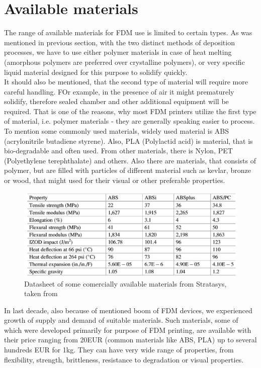 \documentclass[a4paper, twoside, 11pt]{report}
\begin{document}
\section{Available materials}
The range of available materials for FDM use is limited to certain types. As was mentioned in previous section, with the two distinct methods of deposition processes, we have to use either polymer materials in case of heat melting (amorphous polymers are preferred over crystalline polymers), or very specific liquid material designed for this purpose to solidify quickly.\\
	It should also be mentioned, that the second type of material will require more careful handling. FOr example, in the presence of air it might prematurely solidify, therefore sealed chamber and other additional equipment will be required. That is one of the reasons, why most FDM printers utilize the first type of material, i.e. polymer materials - they are generally speaking easier to process.\\
	To mention some commonly used materials, widely used material is ABS (acrylonitrile butadiene styrene). Also, PLA (Polylactid acid) is material, that is bio-degradable and often used. From other materials, there is Nylon, PET (Polyethylene terephthalate) and others. Also there are materials, that consists of polymer, but are filled with particles of different material such as kevlar, bronze or wood, that might used  for their visual or other preferable properties.
\begin{figure}[h]
	\centering
	\includegraphics[scale=0.7]{datasheetFDM}
	\caption{Datasheet of some comercially available materials from Stratasys, taken from \cite[p. 163]{AMT}}
\end{figure}
	In last decade, also because of mentioned boom of FDM devices, we experienced growth of supply and demand of suitable materials. Such materials, some of which were developed primarily for purpose of FDM printing, are available with their price ranging from 20EUR (common materials like ABS, PLA) up to several hundreds EUR for 1kg. They can have very wide range of properties, from flexibility, strength, brittleness, resistance to degradation or visual properties.\\
\end{document}
